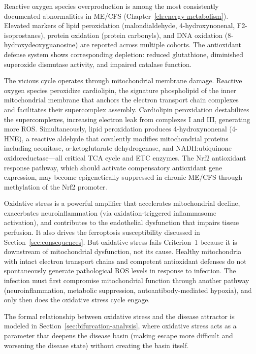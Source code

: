 Reactive oxygen species overproduction is among the most consistently documented abnormalities in ME/CFS (Chapter~\ref{ch:energy-metabolism}). Elevated markers of lipid peroxidation (malondialdehyde, 4-hydroxynonenal, F2-isoprostanes), protein oxidation (protein carbonyls), and DNA oxidation (8-hydroxydeoxyguanosine) are reported across multiple cohorts. The antioxidant defense system shows corresponding depletion: reduced glutathione, diminished superoxide dismutase activity, and impaired catalase function.

The vicious cycle operates through mitochondrial membrane damage. Reactive oxygen species peroxidize cardiolipin, the signature phospholipid of the inner mitochondrial membrane that anchors the electron transport chain complexes and facilitates their supercomplex assembly. Cardiolipin peroxidation destabilizes the supercomplexes, increasing electron leak from complexes I and III, generating more ROS. Simultaneously, lipid peroxidation produces 4-hydroxynonenal (4-HNE), a reactive aldehyde that covalently modifies mitochondrial proteins including aconitase, $\alpha$-ketoglutarate dehydrogenase, and NADH:ubiquinone oxidoreductase---all critical TCA cycle and ETC enzymes. The Nrf2 antioxidant response pathway, which should activate compensatory antioxidant gene expression, may become epigenetically suppressed in chronic ME/CFS through methylation of the Nrf2 promoter.

Oxidative stress is a powerful amplifier that accelerates mitochondrial decline, exacerbates neuroinflammation (via oxidation-triggered inflammasome activation), and contributes to the endothelial dysfunction that impairs tissue perfusion. It also drives the ferroptosis susceptibility discussed in Section~\ref{sec:consequences}. But oxidative stress fails Criterion~1 because it is downstream of mitochondrial dysfunction, not its cause. Healthy mitochondria with intact electron transport chains and competent antioxidant defenses do not spontaneously generate pathological ROS levels in response to infection. The infection must first compromise mitochondrial function through another pathway (neuroinflammation, metabolic suppression, autoantibody-mediated hypoxia), and only then does the oxidative stress cycle engage.

The formal relationship between oxidative stress and the disease attractor is modeled in Section~\ref{sec:bifurcation-analysis}, where oxidative stress acts as a parameter that deepens the disease basin (making escape more difficult and worsening the disease state) without creating the basin itself.


